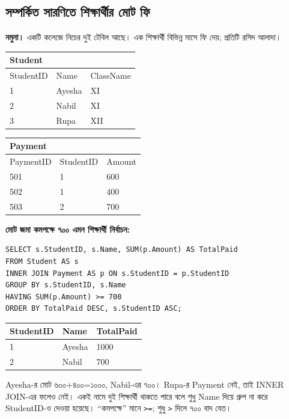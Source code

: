 \subsection{সম্পর্কিত সারণিতে শিক্ষার্থীর মোট ফি}
\textbf{নমুনা।} একটি কলেজে নিচের দুই টেবিল আছে। এক শিক্ষার্থী বিভিন্ন মাসে ফি দেয়; প্রতিটি রসিদ আলাদা।
\begin{flushleft}
\small
\begin{tabular}{|l|l|l|}\hline
\multicolumn{3}{|l|}{Student}\\ \hline
StudentID & Name & ClassName\\ \hline
1 & Ayesha & XI\\\hline
2 & Nabil & XI\\\hline
3 & Rupa & XII\\ \hline
\end{tabular}
\qquad
\begin{tabular}{|l|l|l|}\hline
\multicolumn{3}{|l|}{Payment}\\ \hline
PaymentID & StudentID & Amount\\ \hline
501 & 1 & 600\\\hline
502 & 1 & 400\\\hline
503 & 2 & 700\\ \hline
\end{tabular}
\end{flushleft}

\begin{flushleft}
\small
{}
\end{flushleft}
\textbf{মোট জমা কমপক্ষে ৭০০ এমন শিক্ষার্থী নির্বাচন:}
\begin{verbatim}
SELECT s.StudentID, s.Name, SUM(p.Amount) AS TotalPaid
FROM Student AS s
INNER JOIN Payment AS p ON s.StudentID = p.StudentID
GROUP BY s.StudentID, s.Name
HAVING SUM(p.Amount) >= 700
ORDER BY TotalPaid DESC, s.StudentID ASC;
\end{verbatim}
\begin{flushleft}
\small
\begin{tabular}{|l|l|l|}\hline
StudentID & Name & TotalPaid\\ \hline
1 & Ayesha & 1000\\\hline
2 & Nabil & 700\\ \hline
\end{tabular}
\end{flushleft}
Ayesha-র মোট ৬০০+৪০০=১০০০, Nabil-এর ৭০০। Rupa-র Payment নেই, তাই INNER JOIN-এর ফলেও নেই। একই নামে দুই শিক্ষার্থী থাকতে পারে বলে শুধু Name দিয়ে গ্রুপ না করে StudentID-ও দেওয়া হয়েছে। “কমপক্ষে” মানে \texttt{>=}; শুধু \texttt{>} দিলে ৭০০ বাদ যেত।

